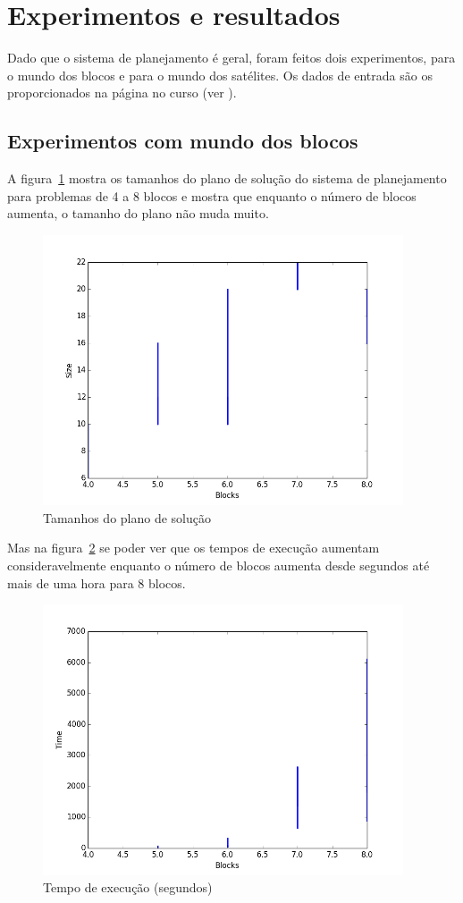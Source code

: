 \section{Experimentos e resultados} 

Dado que o sistema de planejamento é geral, foram feitos dois experimentos, para o mundo dos blocos e para o mundo dos satélites. Os dados de entrada são os proporcionados na página no curso (ver \cite{LabIA15}).

\subsection{Experimentos com mundo dos blocos}
\label{subsec:expblocos}
	A figura~\ref{fig:blockssize} mostra os tamanhos do plano de solução do sistema de planejamento para problemas de 4 a 8 blocos e mostra que enquanto o número de blocos aumenta, o tamanho do plano não muda muito.
		\begin{figure}[H]
			\centering
			\includegraphics[height=8cm]{images/blocks-size}
			\caption{Tamanhos do plano de solução}
			\label{fig:blockssize}
		\end{figure}
	Mas na figura~\ref{fig:blockstime} se poder ver que os tempos de execução aumentam consideravelmente enquanto o número de blocos aumenta desde segundos até mais de uma hora para 8 blocos.
		\begin{figure}[H]
			\centering
			\includegraphics[height=8cm]{images/blocks-time}
			\caption{Tempo de execução (segundos)}
			\label{fig:blockstime}
		\end{figure}
